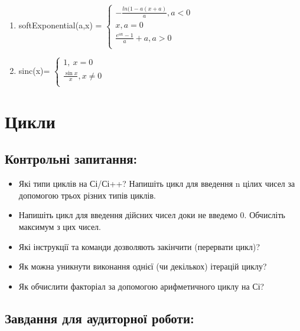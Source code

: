 \documentclass[a5paper,titlepage,openany,twoside,draft]{book_unv}%
\makeatletter
\newcommand{\xslalph}[1]{\expandafter\@xslalph\csname c@#1\endcsname}
\newcommand{\@xslalph}[1]{%
    \ifcase#1\or а\or б\or в\or г\or д\or e\or є\or ж\or з\or i%
    \or й\or к\or л\or м\or н\or о\or п\or р\or с\or т%
    \or у\or ф\or х\or ц\or ч\or ш\or ю\or я\or аа\or бб\or вв%
    \else\@ctrerr\fi%
}
\makeatother
\begin{document}
\begin{enumerate}
\begin{enumerate}[label=\xslalph*)]
\item 
softExponential(a,x) = \(\left\{ \begin{matrix}
 - \frac{ln(1 - a(x + a)}{a},a < 0 \\
x,a = 0 \\
\frac{e^{\text{ax}} - 1}{a} + a,a > 0 \\
\end{matrix} \right.\ \)

\item 
sinc(x)= \(\left\{ \begin{matrix}
1,\ x = 0 \\
\frac{\sin x}{x},x \neq 0 \\
\end{matrix} \right.\ \)

 \end{enumerate}
\end{enumerate}


\chapter{ Цикли }
%

\section{Контрольні запитання:}
\begin{itemize}
\item
  Які типи циклів на Сі/Сі++? Напишіть цикл для введення n цілих чисел
  за допомогою трьох різних типів циклів.
\item
  Напишіть цикл для введення дійсних чисел доки не введемо 0. Обчисліть
  максимум з цих чисел.
\item
  Які інструкції та команди дозволяють закінчити (перервати цикл)?
\item
  Як можна уникнути виконання однієї (чи декількох) ітерацій циклу?
\item
  Як обчислити факторіал за допомогою арифметичного циклу на Сі?
\end{itemize}

\section{Завдання для аудиторної роботи:}
\end{document}
